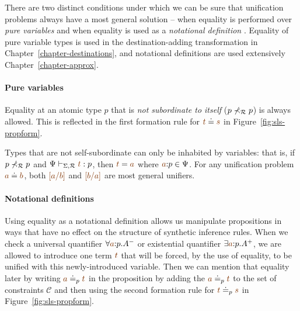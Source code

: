 There are two distinct conditions under which we can be sure that
unification problems always have a most general solution -- when
equality is performed over {\it pure variables} and when equality is
used as a {\it notational definition}
\cite{pfenning99algorithms}. Equality of pure variable types is
used in the destination-adding transformation in
Chapter~\ref{chapter-destinations}, and notational definitions are
used extensively Chapter~\ref{chapter-approx}.

\paragraph{Pure variables} Equality at an atomic type $p$ that is {\it
  not subordinate to itself} ($p \not\prec_\mathcal R p$) is always
allowed.  This is reflected in the first formation rule for $\lf{t}
\doteq \lf{s}$ in Figure~\ref{fig:sls-propform}.

Types that are not self-subordinate can only be inhabited by
variables: that is, if $p \not\prec_\mathcal R p$ and $\Psi
\vdash_{\Sigma,\subord} \lf{t} : p$, then $\lf{t} = \lf{{a}}$ where
$\lf{a}{:}p \in \Psi$. For any unification problem $\lf{{a}} \doteq
\lf{{b}}$, both $\lf{[{a}/b]}$ and $\lf{[{b}/a]}$ are most general
unifiers.


\paragraph{Notational definitions} Using equality as a notational
definition allows us manipulate propositions in ways that have no
effect on the structure of synthetic inference rules. When we check a
universal quantifier $\forall \lf{a}{:}p. A^-$ or existential
quantifier $\exists \lf{a}{:}p.A^+$, we are allowed to introduce one
term $\lf{t}$ that will be forced, by the use of equality, to be
unified with this newly-introduced variable. Then we can mention that
equality later by writing $\lf{a} \doteq_p \lf{t}$ in the proposition
by adding the $\lf{a} \doteq_p \lf{t}$ to the set of constraints
$\mathcal C$ and then using the second formation rule for $\lf{t}
\doteq_p \lf{s}$ in Figure~\ref{fig:sls-propform}.

